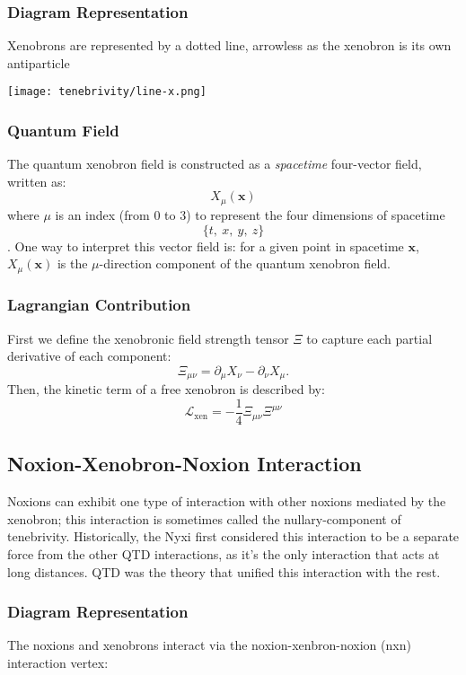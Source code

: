 \subsubsection{Diagram Representation}
Xenobrons are represented by a dotted line, arrowless as the xenobron is its
own antiparticle

\hfill\texttt{[image: tenebrivity/line-x.png]}\hspace*{\fill}

\subsubsection{Quantum Field}

The quantum xenobron field is constructed as a \textit{spacetime} four-vector
field, written as:
\[
  X_{\mu}(\textbf{x})
\]
where \(\mu\) is an index (from 0 to 3) to represent the four dimensions of
spacetime
\[ \{t,\ x,\ y,\ z \} \].
One way to interpret this vector field is: for a given point in spacetime \(\textbf{x}\), \(X_{\mu}(\textbf{x})\) is the \(\mu\)-direction component of the quantum xenobron field.

\subsubsection{Lagrangian Contribution}

First we define the xenobronic field strength tensor \(\Xi\) to capture each
partial derivative of each component:
\[
  \Xi_{\mu \nu} = \partial_{\mu} X_{\nu} - \partial_{\nu} X_{\mu}.
\]
Then, the kinetic term of a free xenobron is described by:
\[
  \mathcal{L}_{\text{xen}} = -\frac{1}{4}\Xi_{\mu \nu}\Xi^{\mu \nu}
\]

\subsection{Noxion-Xenobron-Noxion Interaction}
Noxions can exhibit one type of interaction with other noxions mediated by the
xenobron; this interaction is sometimes called the nullary-component of
tenebrivity. Historically, the Nyxi first considered this interaction to be a
separate force from the other QTD interactions, as it's the only interaction
that acts at long distances. QTD was the theory that unified this interaction
with the rest.

\subsubsection{Diagram Representation}
The noxions and xenobrons interact via the noxion-xenbron-noxion (nxn)
interaction vertex:

